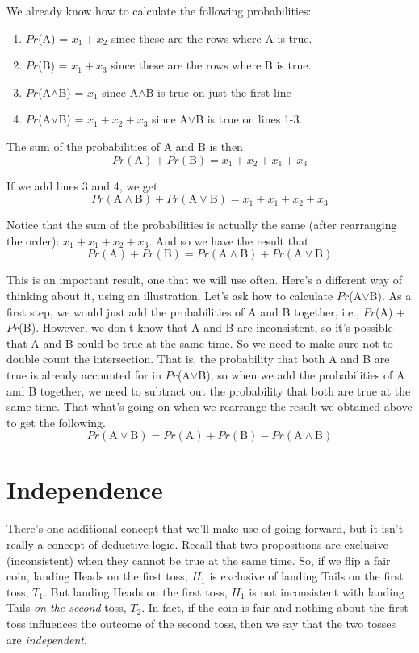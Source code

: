 \documentclass[]{tufte-book}
\providecommand{\tightlist}{%
  \setlength{\itemsep}{0pt}\setlength{\parskip}{0pt}}
\begin{document}
We already know how to calculate the following probabilities:

\begin{enumerate}
\def\labelenumi{\arabic{enumi}.}
\tightlist
\item
  \(Pr\)(A) = \(x_1 + x_2\) since these are the rows where A is true.
\item
  \(Pr\)(B) = \(x_1 + x_3\) since these are the rows where B is true.
\item
  \(Pr\)(A\(\wedge\)B) = \(x_1\) since A\(\wedge\)B is true on just the first line
\item
  \(Pr\)(A\(\vee\)B) = \(x_1 + x_2 + x_3\) since A\(\vee\)B is true on lines 1-3.
\end{enumerate}

The sum of the probabilities of A and B is then
\[
Pr(\text{A}) + Pr(\text{B}) = x_1 + x_2 + x_1 + x_3
\]

If we add lines 3 and 4, we get
\[
Pr(\text{A}\wedge\text{B}) + Pr(\text{A}\vee\text{B}) = x_1 + x_1 + x_2 + x_3
\]

Notice that the sum of the probabilities is actually the same (after rearranging the order): \(x_1 + x_1 + x_2 + x_3\). And so we have the result that
\[
Pr(\text{A}) + Pr(\text{B}) = Pr(\text{A}\wedge\text{B}) + Pr(\text{A}\vee\text{B})
\]

This is an important result, one that we will use often. Here's a different way of thinking about it, using an illustration. Let's ask how to calculate \(Pr\)(A\(\vee\)B). As a first step, we would just add the probabilities of A and B together, i.e., \(Pr\)(A) + \(Pr\)(B). However, we don't know that A and B are inconsistent, so it's possible that A and B could be true at the same time. So we need to make sure not to double count the intersection. That is, the probability that both A and B are true is already accounted for in \(Pr\)(A\(\vee\)B), so when we add the probabilities of A and B together, we need to subtract out the probability that both are true at the same time. That what's going on when we rearrange the result we obtained above to get the following.
\[
 Pr(\text{A}\vee\text{B}) = Pr(\text{A}) + Pr(\text{B}) - Pr(\text{A}\wedge\text{B}) 
\]

\hypertarget{independence}{%
\section{Independence}\label{independence}}

There's one additional concept that we'll make use of going forward, but it isn't really a concept of deductive logic. Recall that two propositions are exclusive (inconsistent) when they cannot be true at the same time. So, if we flip a fair coin, landing Heads on the first toss, \(H_1\) is exclusive of landing Tails on the first toss, \(T_1\). But landing Heads on the first toss, \(H_1\) is not inconsistent with landing Tails \emph{on the second} toss, \(T_2\). In fact, if the coin is fair and nothing about the first toss influences the outcome of the second toss, then we say that the two tosses are \emph{independent}.
\end{document}
